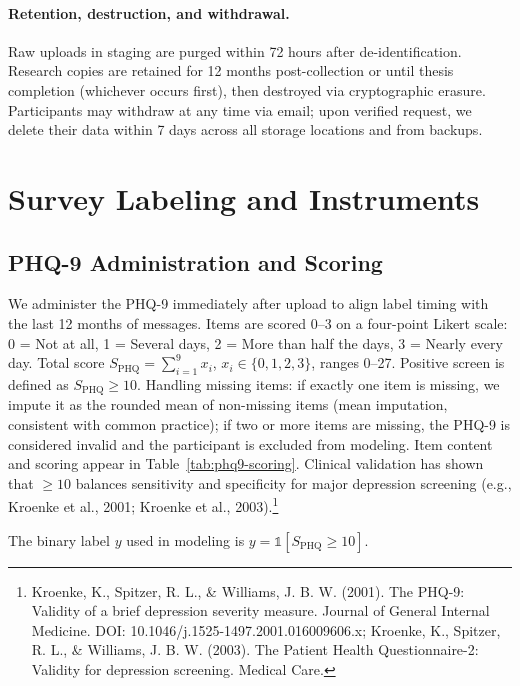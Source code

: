 \paragraph{Retention, destruction, and withdrawal.} Raw uploads in staging are purged within 72 hours after de-identification. Research copies are retained for 12 months post-collection or until thesis completion (whichever occurs first), then destroyed via cryptographic erasure. Participants may withdraw at any time via email; upon verified request, we delete their data within 7 days across all storage locations and from backups.

\section{Survey Labeling and Instruments}
\label{sec:dataset-surveys}
\subsection{PHQ-9 Administration and Scoring}
We administer the PHQ-9 immediately after upload to align label timing with the last 12 months of messages. Items are scored 0--3 on a four-point Likert scale: 0 = Not at all, 1 = Several days, 2 = More than half the days, 3 = Nearly every day. Total score \(S_{\text{PHQ}} = \sum_{i=1}^{9} x_i\), \(x_i \in \{0,1,2,3\}\), ranges 0--27. Positive screen is defined as \(S_{\text{PHQ}} \geq 10\). Handling missing items: if exactly one item is missing, we impute it as the rounded mean of non-missing items (mean imputation, consistent with common practice); if two or more items are missing, the PHQ-9 is considered invalid and the participant is excluded from modeling. Item content and scoring appear in Table~\ref{tab:phq9-scoring}. Clinical validation has shown that \(\geq 10\) balances sensitivity and specificity for major depression screening (e.g., Kroenke et al., 2001; Kroenke et al., 2003).\footnote{Kroenke, K., Spitzer, R. L., \& Williams, J. B. W. (2001). The PHQ-9: Validity of a brief depression severity measure. Journal of General Internal Medicine. DOI: 10.1046/j.1525-1497.2001.016009606.x; Kroenke, K., Spitzer, R. L., \& Williams, J. B. W. (2003). The Patient Health Questionnaire-2: Validity for depression screening. Medical Care.}

The binary label \(y\) used in modeling is \(y = \mathbb{1}[S_{\text{PHQ}} \geq 10]\).


